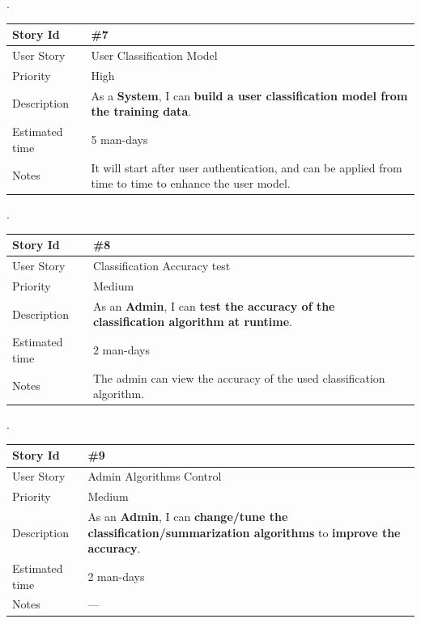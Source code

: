 \documentclass[a4paper,10pt]{article}
\begin{document}
.\\

\begin{tabular}{|p{3cm}|p{10cm}|}
\hline
\cellcolor[gray]{0.9} Story Id & \#7 \\ \hline
\cellcolor[gray]{0.9} User Story & User Classification Model \\ \hline
\cellcolor[gray]{0.9} Priority & High\\ \hline
\cellcolor[gray]{0.9} Description & 
	As a \textbf{System}, I can \textbf{build a user classification 
	model from the training data}. \\ \hline
\cellcolor[gray]{0.9} Estimated time & 5 man-days\\ \hline
\cellcolor[gray]{0.9} Notes & 
	It will start after user authentication, and can be applied 
	from time to time to enhance the user model. \\ \hline
\end{tabular}

.\\

\begin{tabular}{|p{3cm}|p{10cm}|}
\hline
\cellcolor[gray]{0.9} Story Id & \#8 \\ \hline
\cellcolor[gray]{0.9} User Story & Classification Accuracy test \\ \hline
\cellcolor[gray]{0.9} Priority & Medium \\ \hline
\cellcolor[gray]{0.9} Description & 
	As an \textbf{Admin}, I can \textbf{test the accuracy of the 
	classification algorithm at runtime}. \\ \hline
\cellcolor[gray]{0.9} Estimated time & 2 man-days\\ \hline
\cellcolor[gray]{0.9} Notes & 
	The admin can view the accuracy of the used classification algorithm. \\ \hline
\end{tabular}

.\\

\begin{tabular}{|p{3cm}|p{10cm}|}
\hline
\cellcolor[gray]{0.9} Story Id & \#9 \\ \hline
\cellcolor[gray]{0.9} User Story & Admin Algorithms Control \\ \hline
\cellcolor[gray]{0.9} Priority & Medium \\ \hline
\cellcolor[gray]{0.9} Description & 
	As an \textbf{Admin}, I can \textbf{change/tune the 
	classification/summarization algorithms} to
	\textbf{improve the accuracy}. \\ \hline
\cellcolor[gray]{0.9} Estimated time & 2 man-days\\ \hline
\cellcolor[gray]{0.9} Notes & --- \\ \hline
\end{tabular}
\end{document}
